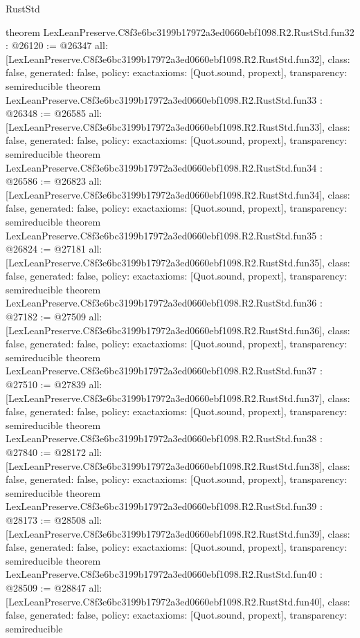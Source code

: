 \begin{lexlean}{RustStd}
\begin{coremodule}
{}
theorem LexLeanPreserve.C8f3e6bc3199b17972a3ed0660ebf1098.R2.RustStd.fun32 : @26120 := @26347 {
  all: [LexLeanPreserve.C8f3e6bc3199b17972a3ed0660ebf1098.R2.RustStd.fun32],
  class: false,
  generated: false,
  policy: exact{axioms: [Quot.sound, propext]},
  transparency: semireducible
}
theorem LexLeanPreserve.C8f3e6bc3199b17972a3ed0660ebf1098.R2.RustStd.fun33 : @26348 := @26585 {
  all: [LexLeanPreserve.C8f3e6bc3199b17972a3ed0660ebf1098.R2.RustStd.fun33],
  class: false,
  generated: false,
  policy: exact{axioms: [Quot.sound, propext]},
  transparency: semireducible
}
theorem LexLeanPreserve.C8f3e6bc3199b17972a3ed0660ebf1098.R2.RustStd.fun34 : @26586 := @26823 {
  all: [LexLeanPreserve.C8f3e6bc3199b17972a3ed0660ebf1098.R2.RustStd.fun34],
  class: false,
  generated: false,
  policy: exact{axioms: [Quot.sound, propext]},
  transparency: semireducible
}
theorem LexLeanPreserve.C8f3e6bc3199b17972a3ed0660ebf1098.R2.RustStd.fun35 : @26824 := @27181 {
  all: [LexLeanPreserve.C8f3e6bc3199b17972a3ed0660ebf1098.R2.RustStd.fun35],
  class: false,
  generated: false,
  policy: exact{axioms: [Quot.sound, propext]},
  transparency: semireducible
}
theorem LexLeanPreserve.C8f3e6bc3199b17972a3ed0660ebf1098.R2.RustStd.fun36 : @27182 := @27509 {
  all: [LexLeanPreserve.C8f3e6bc3199b17972a3ed0660ebf1098.R2.RustStd.fun36],
  class: false,
  generated: false,
  policy: exact{axioms: [Quot.sound, propext]},
  transparency: semireducible
}
theorem LexLeanPreserve.C8f3e6bc3199b17972a3ed0660ebf1098.R2.RustStd.fun37 : @27510 := @27839 {
  all: [LexLeanPreserve.C8f3e6bc3199b17972a3ed0660ebf1098.R2.RustStd.fun37],
  class: false,
  generated: false,
  policy: exact{axioms: [Quot.sound, propext]},
  transparency: semireducible
}
theorem LexLeanPreserve.C8f3e6bc3199b17972a3ed0660ebf1098.R2.RustStd.fun38 : @27840 := @28172 {
  all: [LexLeanPreserve.C8f3e6bc3199b17972a3ed0660ebf1098.R2.RustStd.fun38],
  class: false,
  generated: false,
  policy: exact{axioms: [Quot.sound, propext]},
  transparency: semireducible
}
theorem LexLeanPreserve.C8f3e6bc3199b17972a3ed0660ebf1098.R2.RustStd.fun39 : @28173 := @28508 {
  all: [LexLeanPreserve.C8f3e6bc3199b17972a3ed0660ebf1098.R2.RustStd.fun39],
  class: false,
  generated: false,
  policy: exact{axioms: [Quot.sound, propext]},
  transparency: semireducible
}
theorem LexLeanPreserve.C8f3e6bc3199b17972a3ed0660ebf1098.R2.RustStd.fun40 : @28509 := @28847 {
  all: [LexLeanPreserve.C8f3e6bc3199b17972a3ed0660ebf1098.R2.RustStd.fun40],
  class: false,
  generated: false,
  policy: exact{axioms: [Quot.sound, propext]},
  transparency: semireducible
}
\end{coremodule}
\end{lexlean}
